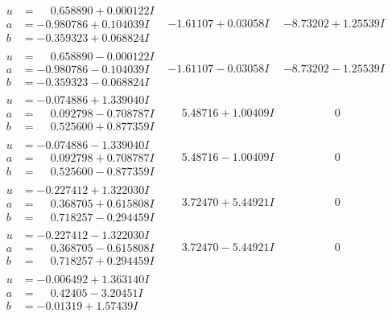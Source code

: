 \documentclass[1p]{elsarticle_modified}
\theoremstyle{definition}
\begin{document}
$$\begin{array}{c|c|c}
\begin{aligned}
u &= \phantom{-}0.658890 + 0.000122 I \\
a &= -0.980786 + 0.104039 I \\
b &= -0.359323 + 0.068824 I\end{aligned}
 & -1.61107 + 0.03058 I & -8.73202 + 1.25539 I \\ \hline\begin{aligned}
u &= \phantom{-}0.658890 - 0.000122 I \\
a &= -0.980786 - 0.104039 I \\
b &= -0.359323 - 0.068824 I\end{aligned}
 & -1.61107 - 0.03058 I & -8.73202 - 1.25539 I \\ \hline\begin{aligned}
u &= -0.074886 + 1.339040 I \\
a &= \phantom{-}0.092798 - 0.708787 I \\
b &= \phantom{-}0.525600 + 0.877359 I\end{aligned}
 & \phantom{-}5.48716 + 1.00409 I & \phantom{-0.000000 } 0 \\ \hline\begin{aligned}
u &= -0.074886 - 1.339040 I \\
a &= \phantom{-}0.092798 + 0.708787 I \\
b &= \phantom{-}0.525600 - 0.877359 I\end{aligned}
 & \phantom{-}5.48716 - 1.00409 I & \phantom{-0.000000 } 0 \\ \hline\begin{aligned}
u &= -0.227412 + 1.322030 I \\
a &= \phantom{-}0.368705 + 0.615808 I \\
b &= \phantom{-}0.718257 - 0.294459 I\end{aligned}
 & \phantom{-}3.72470 + 5.44921 I & \phantom{-0.000000 } 0 \\ \hline\begin{aligned}
u &= -0.227412 - 1.322030 I \\
a &= \phantom{-}0.368705 - 0.615808 I \\
b &= \phantom{-}0.718257 + 0.294459 I\end{aligned}
 & \phantom{-}3.72470 - 5.44921 I & \phantom{-0.000000 } 0 \\ \hline\begin{aligned}
u &= -0.006492 + 1.363140 I \\
a &= \phantom{-}0.42405 - 3.20451 I \\
b &= -0.01319 + 1.57439 I\end{aligned}

\end{array}$$
\end{document}
